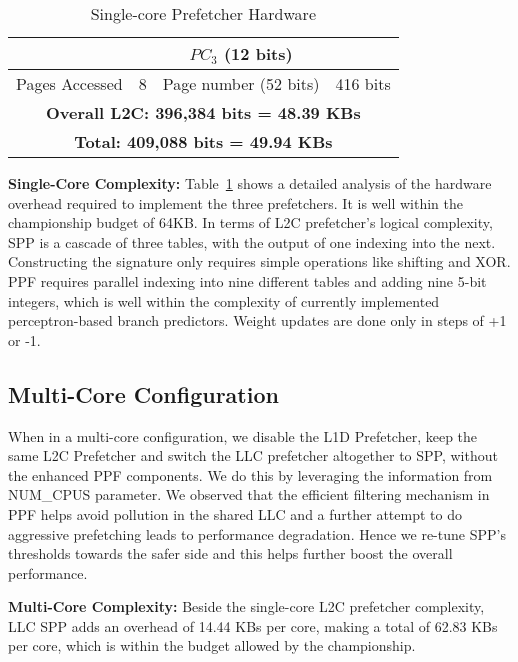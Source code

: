 \begin{table}[h]
\begin{adjustwidth}{}{}
\begin{adjustbox}{width=0.72\columnwidth}
\begin{tabular}{|c|c|c|c|}
                                                    &       & $PC_3$ (12 bits)      &           \\
    \hline
	Pages Accessed			&	8			   & 	Page number (52 bits) 	& 416 bits	\\
    \hline
        \multicolumn{4}{|c|}{\textbf{Overall L2C: 396,384 bits = 48.39 KBs}}\\
    \hline
        \multicolumn{4}{|c|}{\textbf{Total: 409,088 bits = 49.94 KBs}}\\
    \hline
    \end{tabular}
    \end{adjustbox}
    \caption{Single-core Prefetcher Hardware}
    \label{tab:PPF_overhead}
\end{adjustwidth}
\end{table}

\noindent \textbf{Single-Core Complexity:}
Table~\ref{tab:PPF_overhead}
shows a detailed analysis of the hardware overhead required to
implement the three prefetchers. It is well within the championship
budget of 64KB. In terms of L2C prefetcher's logical complexity, SPP
is a cascade of three tables, with the output of one indexing into the
next. Constructing the signature only requires simple operations like
shifting and XOR. PPF requires parallel indexing into nine different
tables and adding nine 5-bit integers, which is well within the
complexity of currently implemented perceptron-based branch
predictors.  Weight updates are done only in steps of +1 or -1.

\subsection{Multi-Core Configuration}
\label{Config-Multi}

When in a multi-core configuration, we disable the L1D Prefetcher, keep 
the same L2C Prefetcher and switch the LLC prefetcher altogether to SPP, 
without the enhanced PPF components.
We do this by leveraging the information from NUM\_CPUS parameter.
We observed that the efficient filtering mechanism in PPF helps avoid 
pollution in the shared LLC and a further attempt to do aggressive
prefetching leads to performance degradation.
Hence we re-tune SPP's thresholds towards the safer side and this
helps further boost the overall performance. 

\noindent \textbf{Multi-Core Complexity:}
Beside the single-core L2C prefetcher complexity, LLC SPP adds an overhead 
of 14.44 KBs per core, making a total of 62.83 KBs per core, which is within 
the budget allowed by the championship.
